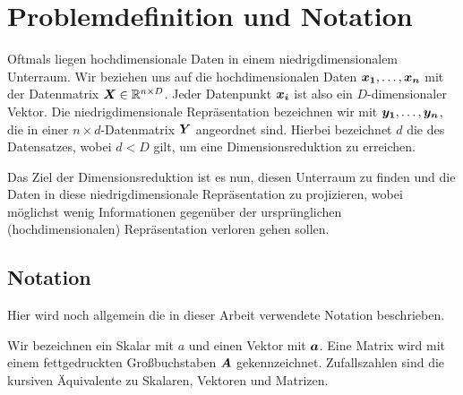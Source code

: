 \chapter{Problemdefinition und Notation}
\label{ch:ProblemdefinitionUndNotation}

Oftmals liegen hochdimensionale Daten in einem niedrigdimensionalem Unterraum. Wir beziehen uns auf die hochdimensionalen Daten $\boldsymbol{x_1},\ldots,\boldsymbol{x_n}$ mit der Datenmatrix $\boldsymbol{X} \in \mathbb{R}^{n \times D}$. Jeder Datenpunkt $\boldsymbol{x_i}$ ist also ein $D$-dimensionaler Vektor. Die niedrigdimensionale Repräsentation bezeichnen wir mit $\boldsymbol{y_1},\ldots,\boldsymbol{y_n}$, die in einer $n \times d$-Datenmatrix $\boldsymbol{Y}$ angeordnet sind. Hierbei bezeichnet $d$ die
 des Datensatzes, wobei $d < D$ gilt, um eine Dimensionsreduktion zu erreichen.


Das Ziel der Dimensionsreduktion ist es nun, diesen Unterraum zu finden und die Daten in diese niedrigdimensionale Repräsentation zu projizieren, wobei möglichst wenig Informationen gegenüber der ursprünglichen (hochdimensionalen) Repräsentation verloren gehen sollen.

\section{Notation}

Hier wird noch allgemein die in dieser Arbeit verwendete Notation beschrieben.

Wir bezeichnen ein Skalar mit $a$ und einen Vektor mit $\boldsymbol{a}$. Eine Matrix wird mit einem fettgedruckten Großbuchstaben $\boldsymbol{A}$ gekennzeichnet.
Zufallszahlen sind die kursiven Äquivalente zu Skalaren, Vektoren und Matrizen.

